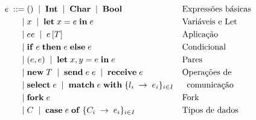 \begin{figure}
  \begin{align*}
    e \; ::= \; & () \;\mid\; \mathbf{Int} \;\mid\; \mathbf{Char} \;\mid\; \mathbf{Bool} && \text{Expressões básicas}\\
    \;\mid\; & x \;\mid\; \mathbf{let} \; x = e \; \mathbf{in} \; e && \text{Variáveis e Let}\\
    \;\mid\; & ee \;\mid\; e\,[T] && \text{Aplicação}\\
    \;\mid\; & \mathbf{if}\;e\;\mathbf{then}\;e\;\mathbf{else} \; e && \text{Condicional}\\
    \;\mid\; & (e,e) \;\mid\; \mathbf{let}\;x, y = e\;\mathbf{in}\;e && \text{Pares}\\
    \;\mid\; & \mathbf{new}\;T \;\mid\; \mathbf{send}\;e\; e \;\mid\; \mathbf{receive}\;e && \text{Operações de}\\
    \;\mid\; & \mathbf{select}\;e \;\mid\; \mathbf{match}\;e\;\mathbf{with}\;\{l_i\;\to\;e_i\}_{i\in I} && \text{\;\;comunicação} \\
    \;\mid\; & \mathbf{fork}\;e  && \text{Fork}\\
    \;\mid\; & C \;\mid\; \mathbf{case}\;e\;\mathbf{of}\;\{C_i\;\to\;e_i\}_{i\in I} && \text{Tipos de dados}
  \end{align*}
\end{figure}


